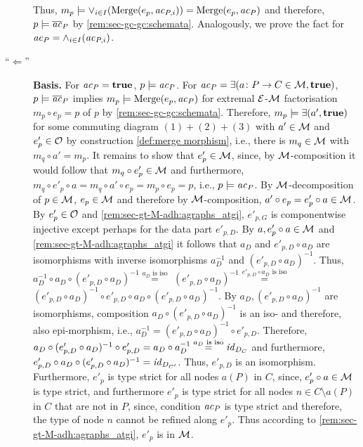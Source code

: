 \begin{description}
    Thus, $m_p \models \vee_{i \in I}(\mathrm{Merge}(e_p,\mathit{ac}_{P,i}))=\mathrm{Merge}(e_p,\mathit{ac}_P)$ and therefore, $p \models \overline{\mathit{ac}}_P$ by \cref{rem:sec-gc-gc:schemata}.
    Analogously, we prove the fact for $\mathit{ac}_P=\wedge_{i \in I}(\mathit{ac}_{P,i})$.
    \item[``$\Leftarrow$''] \textbf{Basis.}\thispagestyle{plain}
    For $\mathit{ac}_P=\textbf{true}$, $p \models \mathit{ac}_P$.
    For $\mathit{ac}_P=\exists(a\colon P \to C \in {\cal M},\textbf{true})$, $p \models \overline{\mathit{ac}}_P$ implies $m_p \models \mathrm{Merge}(e_p,\mathit{ac}_P)$ for extremal $\mathcal{E}$-${\cal M}$ factorisation $m_p \circ e_p=p$ of $p$ by \cref{rem:sec-gc-gc:schemata}.
    Therefore, $m_p \models \exists(a',\textbf{true})$ for some commuting diagram $(1)+(2)+(3)$ with $a' \in {\cal M}$ and $e'_p \in {\cal O}$ by construction \cref{def:merge morphism}, i.e., there is $m_q \in {\cal M}$ with $m_q \circ a'=m_p$.
    It remains to show that $e'_p \in {\cal M}$, since, by ${\cal M}$-composition it would follow that $m_q \circ e'_p \in {\cal M}$ and furthermore, $m_q \circ e'_p \circ a=m_q \circ a' \circ e_p=m_p \circ e_p=p$, i.e., $p \models \mathit{ac}_P$.
    By ${\cal M}$-decomposition of $p \in {\cal M}$, $e_p \in {\cal M}$ and therefore by ${\cal M}$-composition, $a' \circ e_p=e'_p \circ a \in {\cal M}$.
    By $e'_p \in {\cal O}$ and \cref{rem:sec-gt-M-adh:agraphs_atgi}, $e'_{p,G}$ is componentwise injective except perhaps for the data part $e'_{p,D}$.
    By $a,e'_p \circ a \in {\cal M}$ and \cref{rem:sec-gt-M-adh:agraphs_atgi} it follows that $a_D$ and $e'_{p,D} \circ a_D$ are isomorphisms with inverse isomorphisms $a_D^{-1}$ and $(e'_{p,D} \circ a_D)^{-1}$.
    Thus, $a_D^{-1} \circ a_D \circ (e'_{p,D} \circ a_D)^{-1} \stackrel{a_D \text{ is iso}}{=}$ $(e'_{p,D} \circ a_D)^{-1} \stackrel{e'_{p,D} \circ a_D \text{ is iso}}{=}$ $(e'_{p,D} \circ a_D)^{-1} \circ e'_{p,D} \circ a_D \circ (e'_{p,D} \circ a_D)^{-1}$.
    By $a_D,(e'_{p,D} \circ a_D)^{-1}$ are isomorphisms, composition $a_D \circ (e'_{p,D} \circ a_D)^{-1}$ is an iso- and therefore, also epi-morphism, i.e., $a_D^{-1}=(e'_{p,D} \circ a_D)^{-1} \circ e'_{p,D}$.
    Therefore, $a_D \circ (e'_{p,D} \circ a_D)^{-1} \circ e'_{p,D}=a_D \circ a_D^{-1} \stackrel{a_D \text{ is iso}}{=} \mathit{id}_{D_C}$ and furthermore, $e'_{p,D} \circ a_D \circ (e'_{p,D} \circ a_D)^{-1}=\mathit{id}_{D_{C'}}$.
    Thus, $e'_{p,D}$ is an isomorphism.
    Furthermore, $e'_p$ is type strict for all nodes $a(P)$ in $C$, since, $e'_p \circ a \in {\cal M}$ is type strict, and furthermore $e'_p$ is type strict for all nodes $n \in C \setminus a(P)$ in $C$ that are not in $P$, since, condition $\mathit{ac}_P$ is type strict and therefore, the type of node $n$ cannot be refined along $e'_p$.
    Thus according to \cref{rem:sec-gt-M-adh:agraphs_atgi}, $e'_p$ is in ${\cal M}$.

\end{description}
